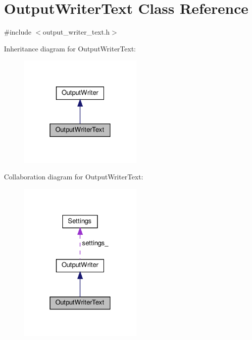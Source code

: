 \hypertarget{classOutputWriterText}{}\section{Output\+Writer\+Text Class Reference}
\label{classOutputWriterText}


{\ttfamily \#include $<$output\+\_\+writer\+\_\+text.\+h$>$}



Inheritance diagram for Output\+Writer\+Text\+:\nopagebreak
\begin{figure}[H]
\begin{center}
\leavevmode
\includegraphics[width=171pt]{classOutputWriterText__inherit__graph}
\end{center}
\end{figure}


Collaboration diagram for Output\+Writer\+Text\+:
\nopagebreak
\begin{figure}[H]
\begin{center}
\leavevmode
\includegraphics[width=171pt]{classOutputWriterText__coll__graph}
\end{center}
\end{figure}
